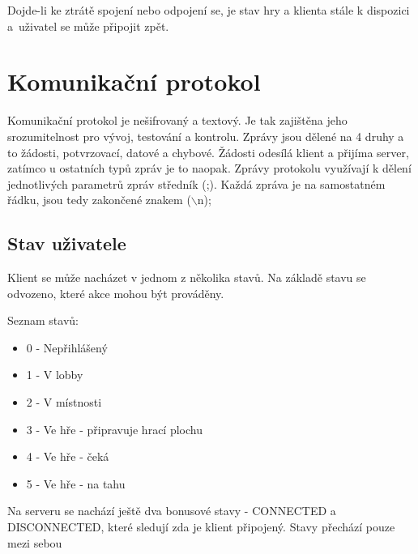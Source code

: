 \documentclass[12pt, a4paper]{article} %
\begin{document}
	\par Dojde-li ke ztrátě spojení nebo odpojení se, je stav hry a klienta stále k dispozici a uživatel se může připojit zpět.

	\section{Komunikační protokol}
	\par Komunikační protokol je nešifrovaný a textový. Je tak zajištěna jeho srozumitelnost pro vývoj, testování a kontrolu. Zprávy jsou dělené na 4 druhy a to žádosti, potvrzovací, datové a chybové. Žádosti odesílá klient a přijíma server, zatímco u ostatních typů zpráv je to naopak. Zprávy protokolu využívají k dělení jednotlivých parametrů zpráv středník (;). Každá zpráva je na samostatném řádku, jsou tedy zakončené znakem ($\backslash$n);
	
	\subsection{Stav uživatele}
	\par Klient se může nacházet v jednom z několika stavů. Na základě stavu se odvozeno, které akce mohou být prováděny.
	
	\par Seznam stavů:
	\begin{itemize}
		\item 0 - Nepřihlášený
		\item 1 - V lobby
		\item 2 - V místnosti
		\item 3 - Ve hře - připravuje hrací plochu
		\item 4 - Ve hře - čeká
		\item 5 - Ve hře - na tahu		
	\end{itemize}
	\par Na serveru se nachází ještě dva bonusové stavy - CONNECTED a DISCONNECTED, které sledují zda je klient připojený. Stavy přechází pouze mezi sebou
\end{document}
